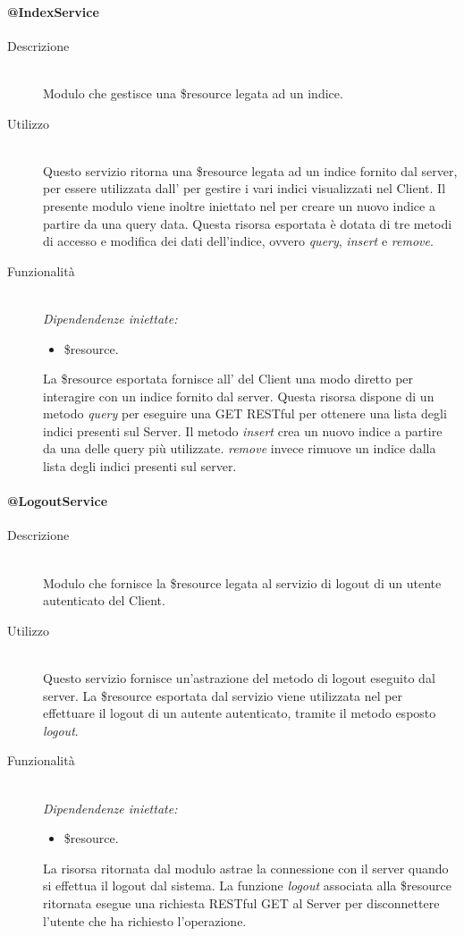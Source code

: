 \paragraph{@IndexService}
\begin{description}
 \item[Descrizione] \hfill \\
 Modulo che gestisce una \$resource legata ad un indice.
 \item[Utilizzo] \hfill \\
 Questo servizio ritorna una \$resource legata ad un indice fornito dal server, per essere utilizzata dall' per gestire i vari 
 indici visualizzati nel Client. Il presente modulo viene inoltre iniettato nel  per creare un nuovo indice a partire da una 
 query data. Questa risorsa esportata è dotata di tre metodi di accesso e modifica dei dati dell'indice, ovvero
 \textit{query}, \textit{insert} e \textit{remove}.
 \item[Funzionalità] \hfill \\
 \emph{Dipendendenze iniettate:}
 \begin{itemize}
  \item \$resource.
 \end{itemize}
 La \$resource esportata fornisce all' del Client una modo diretto per interagire con un indice fornito dal server. Questa risorsa dispone di un metodo \textit{query} per eseguire una GET RESTful per ottenere una lista degli indici presenti sul Server.
 Il metodo \textit{insert} crea un nuovo indice a partire da una delle query più utilizzate. \textit{remove} invece rimuove un indice dalla lista degli indici presenti sul server.
\end{description}

\paragraph{@LogoutService}
\begin{description}
 \item[Descrizione] \hfill \\
 Modulo che fornisce la \$resource legata al servizio di logout di un utente autenticato del Client.
 \item[Utilizzo] \hfill \\
  Questo servizio fornisce un'astrazione del metodo di logout eseguito dal server. La \$resource esportata dal servizio viene utilizzata
  nel  per effettuare il logout di un autente autenticato, tramite il metodo esposto \textit{logout}. 
 \item[Funzionalità] \hfill \\
 \emph{Dipendendenze iniettate:}
 \begin{itemize}
  \item \$resource.
 \end{itemize}
 La risorsa ritornata dal modulo astrae la connessione con il server quando si effettua il logout dal sistema. La funzione \textit{logout} 
 associata alla \$resource ritornata esegue una richiesta RESTful GET al Server per disconnettere l'utente che ha richiesto l'operazione.
\end{description}

